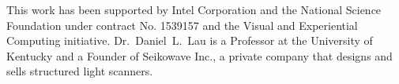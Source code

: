 \documentclass[]{spie}  %
\begin{document}
\acknowledgments
This work has been supported by Intel Corporation and the National Science Foundation under contract No. 1539157 and the Visual and Experiential Computing initiative. Dr.~Daniel~L.~Lau is a Professor at the University of Kentucky and a Founder of Seikowave Inc., a private company that designs and sells structured light scanners.

\end{document}
